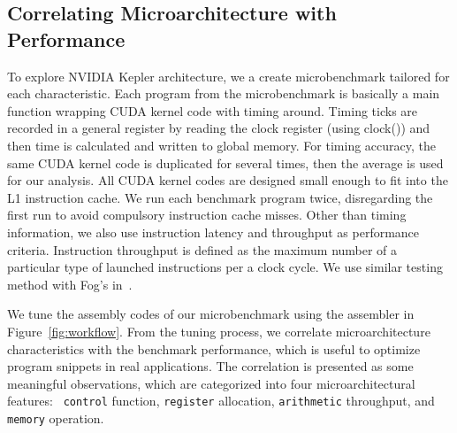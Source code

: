 \subsection{Correlating Microarchitecture with Performance}
\label{sec:benchmark}


To explore NVIDIA Kepler architecture, we a create microbenchmark tailored for each characteristic.
Each program from the microbenchmark is basically a main function wrapping CUDA kernel code with timing around.
Timing ticks are recorded in a general register by reading the clock register (using clock()) and then time is calculated and written to global memory.
For timing accuracy, the same CUDA kernel code is duplicated for several times, then the average is used for our analysis.
All CUDA kernel codes are designed small enough to fit into the L1 instruction cache.
We run each benchmark program twice, disregarding the first run to avoid compulsory instruction cache misses. 
Other than timing information, we also use instruction latency and throughput as performance criteria.
Instruction throughput is defined as the maximum number of a particular type of launched instructions per a clock cycle.
We use similar testing method with Fog's in~\cite{fog}.


We tune the assembly codes of our microbenchmark using the assembler in Figure~\ref{fig:workflow}.
From the tuning process, we correlate microarchitecture characteristics with the benchmark performance, which is useful to optimize program snippets in real applications.
The correlation is presented as some meaningful observations, which are categorized into four microarchitectural features:  {\tt 
control} function, {\tt register} allocation, {\tt arithmetic} throughput, and {\tt memory} operation.


